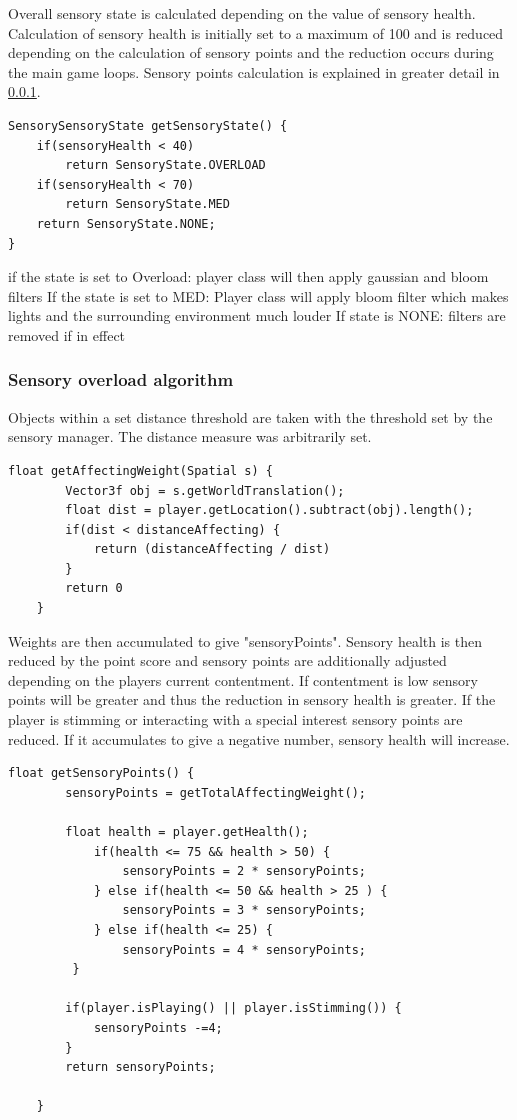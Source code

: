 \documentclass[11pt]{report}
\begin{document}
Overall sensory state is calculated depending on the value of sensory health. Calculation of sensory health is initially set to a maximum of 100 and is reduced depending on the calculation of sensory points and the reduction occurs during the main game loops. Sensory points calculation is explained in greater detail in \ref{sec:prototypesensoryoverloadalgorithm}.

\begin{lstlisting}
SensorySensoryState getSensoryState() {
	if(sensoryHealth < 40)
		return SensoryState.OVERLOAD
	if(sensoryHealth < 70)
		return SensoryState.MED
	return SensoryState.NONE;
}
\end{lstlisting}

if the state is set to Overload: player class will then apply gaussian and bloom filters
If the state is set to MED: Player class will apply bloom filter which makes lights and the surrounding environment much louder
If state is NONE: filters are removed if in effect


\subsubsection{Sensory overload algorithm}
\label{sec:prototypesensoryoverloadalgorithm}
Objects within a set distance threshold are taken with the threshold set by the sensory manager. The distance measure was arbitrarily set.

\begin{lstlisting}
float getAffectingWeight(Spatial s) {
        Vector3f obj = s.getWorldTranslation();
        float dist = player.getLocation().subtract(obj).length();
        if(dist < distanceAffecting) {
            return (distanceAffecting / dist)
        }       
        return 0
    }
\end{lstlisting}

Weights are then accumulated to give "sensoryPoints". Sensory health is then reduced by the point score and sensory points are additionally adjusted depending on the players current contentment. If contentment is low sensory points will be greater and thus the reduction in sensory health is greater. If the player is stimming or interacting with a special interest sensory points are reduced. If it accumulates to give a negative number, sensory health will increase.

\begin{lstlisting}
float getSensoryPoints() {       
        sensoryPoints = getTotalAffectingWeight();
        
        float health = player.getHealth();
            if(health <= 75 && health > 50) {
                sensoryPoints = 2 * sensoryPoints;
            } else if(health <= 50 && health > 25 ) {
                sensoryPoints = 3 * sensoryPoints;
            } else if(health <= 25) {
                sensoryPoints = 4 * sensoryPoints;
         }
        
        if(player.isPlaying() || player.isStimming()) {
            sensoryPoints -=4;
        }       
        return sensoryPoints;
        
    }
\end{lstlisting}
\end{document}
